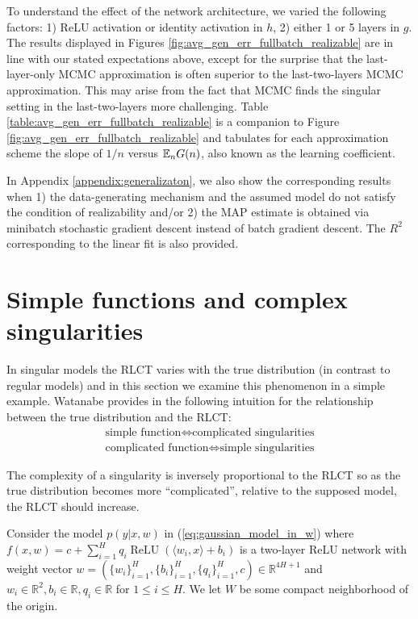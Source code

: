\documentclass{article} %
\begin{document}
To understand the effect of the network architecture, we varied the following factors: 1) ReLU activation or identity activation in $h$, 2) either 1 or 5 layers in $g$. 
The results displayed in Figures \ref{fig:avg_gen_err_fullbatch_realizable} are in line with our stated expectations above, except for the surprise that the last-layer-only MCMC approximation is often superior to the last-two-layers MCMC approximation. This may arise from the fact that MCMC finds the singular setting in the last-two-layers more challenging. Table \ref{table:avg_gen_err_fullbatch_realizable} is a companion to Figure \ref{fig:avg_gen_err_fullbatch_realizable} and tabulates for each approximation scheme the slope of $1/n$ versus ${\mathbb{E}}_n G(n)$, also known as the learning coefficient.


In Appendix \ref{appendix:generalizaton}, we also show the corresponding results when 1) the data-generating mechanism and the assumed model do not satisfy the condition of realizability and/or 2) the MAP estimate is obtained via minibatch stochastic gradient descent instead of batch gradient descent. The $R^2$ corresponding to the linear fit is also provided. 



\section{Simple functions and complex singularities}\label{section:simple_func}

In singular models the RLCT varies with the true distribution (in contrast to regular models) and in this section we examine this phenomenon in a simple example. Watanabe provides in \citep[\S 7.6]{watanabe_algebraic_2009} the following intuition for the relationship between the true distribution and the RLCT:
\begin{align*}
\text{simple function} \iff \text{complicated singularities}\\
\text{complicated function} \iff \text{simple singularities}
\end{align*}

The complexity of a singularity is inversely proportional to the RLCT so as the true distribution becomes more ``complicated'', relative to the supposed model, the RLCT should increase.

Consider the model $p(y|x,w)$ in (\ref{eq:gaussian_model_in_w}) where
$
f(x,w) = c + \sum_{i=1}^H q_i \operatorname{ReLU}( \langle w_i, x \rangle + b_i )
$
is a two-layer ReLU network with weight vector $w = (\{w_i\}_{i=1}^H, \{b_i\}_{i=1}^H, \{q_i\}_{i=1}^H, c) \in \mathbb{R}^{4H+1}$ and $w_i \in \mathbb{R}^2, b_i \in \mathbb{R}, q_i \in \mathbb{R}$ for $1 \le i \le H$. We let $W$ be some compact neighborhood of the origin.
\end{document}
